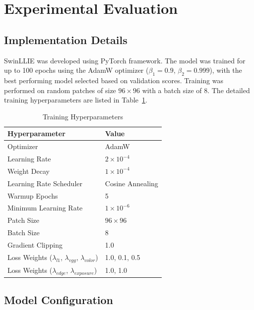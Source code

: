 \documentclass[sigconf]{acmart}
\begin{document}
\section{Experimental Evaluation}

\subsection{Implementation Details}

SwinLLIE was developed using PyTorch framework. The model was trained for up to 100 epochs using the AdamW optimizer ($\beta_1 = 0.9$, $\beta_2 = 0.999$), with the best performing model selected based on validation scores. Training was performed on random patches of size $96 \times 96$ with a batch size of 8. The detailed training hyperparameters are listed in Table~\ref{tab:training_config}.

\begin{table}[htbp]
\caption{Training Hyperparameters}
\centering
\begin{tabular}{ll}
\toprule
\textbf{Hyperparameter} & \textbf{Value} \\
\midrule
Optimizer & AdamW \\
Learning Rate & $2 \times 10^{-4}$ \\
Weight Decay & $1 \times 10^{-4}$ \\
Learning Rate Scheduler & Cosine Annealing \\
Warmup Epochs & 5 \\
Minimum Learning Rate & $1 \times 10^{-6}$ \\
Patch Size & $96 \times 96$ \\
Batch Size & 8 \\
Gradient Clipping & 1.0 \\
\midrule
Loss Weights ($\lambda_{l1}$, $\lambda_{vgg}$, $\lambda_{color}$) & 1.0, 0.1, 0.5 \\
Loss Weights ($\lambda_{edge}$, $\lambda_{exposure}$) & 1.0, 1.0 \\
\bottomrule
\end{tabular}
\label{tab:training_config}
\end{table}

\subsection{Model Configuration}
\end{document}
